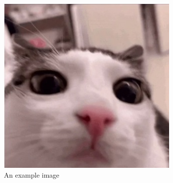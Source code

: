 \documentclass{article}
\begin{document}
\begin{figure}[H]
\centering
\includegraphics[width=0.8\textwidth]{cat_pic.jpg}
\caption{An example image}
\label{fig:example}
\end{figure}
\end{document}
